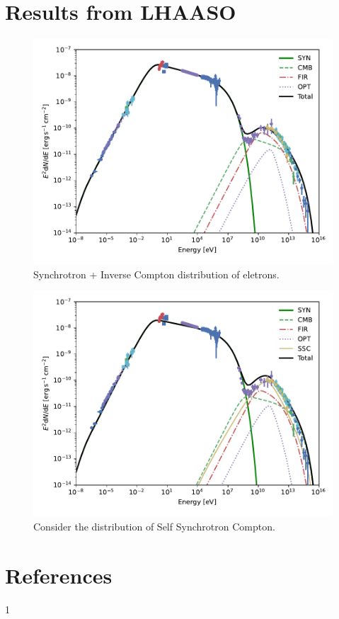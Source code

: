 \documentclass[9pt, mathserif]{beamer}
\begin{document}
    \section{Results from LHAASO}
        \begin{frame}
            \begin{figure}[t]
                \centering
                \includegraphics[width=0.8\linewidth]{SynIC-BestFitPar1.pdf}
                \caption{Synchrotron + Inverse Compton distribution of eletrons.}
            \end{figure}
        \end{frame}
        \begin{frame}
            \begin{figure}[t]
                \centering
                \includegraphics[width=0.8\linewidth]{SynIC-BestFitPar2.pdf}
                \caption{Consider the distribution of Self Synchrotron Compton.}
            \end{figure}
        \end{frame}





    \section{References}
        \begin{frame}
            \begin{thebibliography}{1}
                1
            \end{thebibliography}
        \end{frame}
\end{document}
